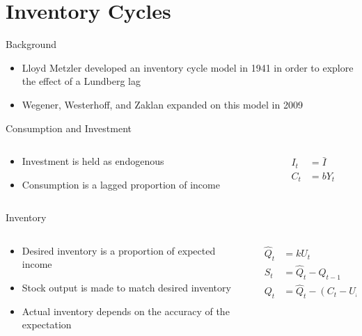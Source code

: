 \documentclass{beamer}
\begin{document}
\section*{Inventory Cycles}
\begin{frame}{Background}
	\begin{itemize}
		\item Lloyd Metzler developed an inventory cycle model in 1941 in order to explore the effect of a Lundberg lag\autocite{Metzler1941}
		\item Wegener, Westerhoff, and Zaklan expanded on this model in 2009\autocite{Wegener2009}
	\end{itemize}
\end{frame}
\begin{frame}{Consumption and Investment}
	\begin{columns}
	\begin{column}{0.5\textwidth}
		\begin{itemize}
			\item Investment is held as endogenous 
			\item Consumption is a lagged proportion of income
		\end{itemize}
	\end{column}
	\begin{column}{0.5\textwidth}
		\begin{align}
			I_t &= \bar I\\
			C_t &= bY_t
		\end{align}
	\end{column}
	\end{columns}
\end{frame}

\begin{frame}{Inventory}
	\begin{columns}
	\begin{column}{0.5\textwidth}
		\begin{itemize}
			\item Desired inventory is a proportion of expected income
			\item Stock output is made to match desired inventory
			\item Actual inventory depends on the accuracy of the expectation
		\end{itemize}
	\end{column}
	\begin{column}{0.5\textwidth}
		\begin{align*}
			\hat Q_t &= kU_t\\
			S_t &= \hat Q_t - Q_{t-1}\\
			Q_t &= \hat Q_t - (C_t-U_t)
		\end{align*}
	\end{column}
	\end{columns}
\end{frame}
\end{document}
